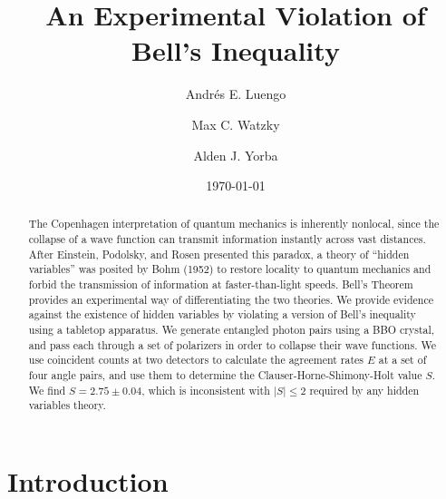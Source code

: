 \documentclass[letter,scriptaddress,twocolumn, prl, nofootinbib]{revtex4}
\begin{document}
\title{An Experimental Violation of Bell's Inequality}

\author{Andr\'{e}s E. Luengo}
\author{Max C. Watzky}
\author{Alden J. Yorba} 


\date{\today}

\begin{abstract}
The Copenhagen interpretation of quantum mechanics is inherently nonlocal, since the collapse of a wave function can transmit information instantly across vast distances. After Einstein, Podolsky, and Rosen presented this paradox, a theory of ``hidden variables'' was posited by Bohm (1952) to restore locality to quantum mechanics and forbid the transmission of information at faster-than-light speeds. Bell's Theorem provides an experimental way of differentiating the two theories. We provide evidence against the existence of hidden variables by violating a version of Bell's inequality using a tabletop apparatus. We generate entangled photon pairs using a BBO crystal, and pass each through a set of polarizers in order to collapse their wave functions. We use coincident counts at two detectors to calculate  the agreement rates $E$ at a set of four angle pairs, and use them to determine the Clauser-Horne-Shimony-Holt value $S$. We find $S = 2.75 \pm 0.04$, which is inconsistent with $|S| \le 2$ required by any hidden variables theory.

\end{abstract}


\maketitle

\section{Introduction}
\end{document}
